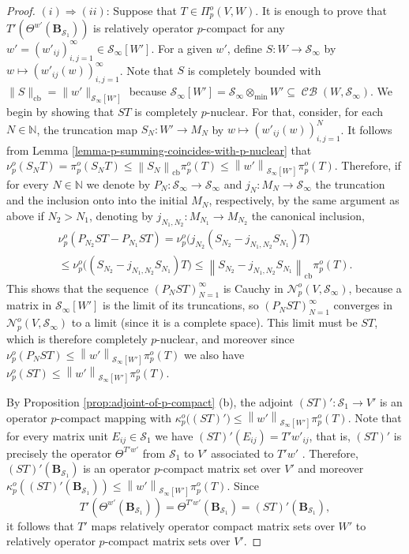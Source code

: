 \documentclass[11pt]{amsart}
\DeclareMathOperator{\cb}{cb}
\DeclareMathOperator{\CB}{\mathcal{CB}}
\newcommand{\n}[1]{ \left\|#1\right\| }
\newcommand{\N}{{\mathbb{N}}}
\numberwithin{equation}{section}
\begin{document}
\begin{proof}
$(i) \Rightarrow (ii)$: Suppose that $T \in \Pi_p^o(V,W)$. It is enough to prove that $T'(\Theta^{w'}(\mathbf{B}_{\mathcal{S}_1}))$ is relatively operator $p$-compact for any 
$w' = (w'_{ij})_{i,j=1}^\infty \in \mathcal{S}_\infty[W']$.  For a given $w'$, define $S : W \to \mathcal{S}_\infty$ by $w \mapsto (w'_{ij}(w))_{i,j=1}^\infty$.
Note that $S$ is completely bounded with $\|S\|_{\cb}=\|w'\|_{\mathcal{S}_\infty[W']}$ because $\mathcal{S}_\infty[W'] = \mathcal{S}_\infty \otimes_{\min} W' \subseteq \CB(W, \mathcal{S}_\infty)$. We begin by showing that $ST$ is completely $p$-nuclear. For that, consider, for each $N\in\N$, the truncation map $S_N : W' \to M_N$ by $w \mapsto (w'_{ij}(w))_{i,j=1}^N$.
It follows from Lemma \ref{lemma-p-summing-coincides-with-p-nuclear} that $\nu^o_p(S_NT) = \pi^o_p(S_NT) \le \n{S_N}_{\cb}\pi_p^o(T) \le \n{w'}_{\mathcal{S}_\infty[W']} \pi_p^o(T)$.
Therefore, if for every $N\in\N$ we denote by $P_N :\mathcal{S}_\infty \to \mathcal{S}_\infty$ and $j_N : M_N \to \mathcal{S}_\infty$ the truncation and the inclusion onto into the initial $M_N$, respectively, by the same argument as above if $N_2>N_1$, denoting by $j_{N_1,N_2} : M_{N_1} \to M_{N_2}$ the canonical inclusion,
\begin{multline*}
\nu_p^o(P_{N_2}ST - P_{N_1}ST) = 
\nu_p^o\big( j_{N_2}(S_{N_2} -  j_{N_1,N_2}S_{N_1} )T \big) \\
\le \nu_p^o\big( (S_{N_2} - j_{N_1,N_2}S_{N_1} )T \big) \le \n{ S_{N_2}-j_{N_1,N_2}S_{N_1} }_{\cb} \pi_p^o(T).
\end{multline*}
 This shows that the sequence $( P_NST )_{N=1}^\infty$ is Cauchy in $\mathcal{N}_p^o(V,\mathcal{S}_\infty)$, because a matrix in $\mathcal{S}_\infty[W']$ is the limit of its truncations,
so $( P_NST )_{N=1}^\infty$ converges in $\mathcal{N}_p^o(V,\mathcal{S}_\infty)$ to a limit (since it is a complete space).
This limit must be $ST$, which is therefore completely $p$-nuclear, and moreover since $\nu^o_p(P_NST) \le \n{w'}_{\mathcal{S}_\infty[W']} \pi_p^o(T)$ we also have $\nu^o_p(ST) \le \n{w'}_{\mathcal{S}_\infty[W']} \pi_p^o(T)$.

By Proposition \ref{prop:adjoint-of-p-compact} (b), the adjoint $(ST)' : \mathcal{S}_1 \to V'$ is an operator $p$-compact mapping with $\kappa_p^o\big((ST)'\big) \le \n{w'}_{\mathcal{S}_\infty[W']} \pi_p^o(T)$.
Note that for every matrix unit $E_{ij} \in \mathcal{S}_1$ 
we have $(ST)'(E_{ij}) = T'w'_{ij}$, that is, $(ST)'$ is precisely the operator $\Theta^{T'w'}$ from $\mathcal{S}_1$ to $V'$ associated to $T'w'$ 
. Therefore, $(ST)'(\mathbf{B}_{\mathcal{S}_1})$ is an operator $p$-compact matrix set over $V'$ and moreover $\kappa_p^o\left( (ST)'(\mathbf{B}_{\mathcal{S}_1}) \right) \le \n{w'}_{\mathcal{S}_\infty[W']} \pi_p^o(T)$.
Since
\[
T'(\Theta^{w'}(\mathbf{B}_{\mathcal{S}_1})) = \Theta^{T'w'}(\mathbf{B}_{\mathcal{S}_1}) = (ST)'(\mathbf{B}_{\mathcal{S}_1}),
\]
it follows that $T'$ maps relatively operator compact matrix sets over $W'$ to relatively operator $p$-compact matrix sets over $V'$.


\end{proof}
\end{document}
